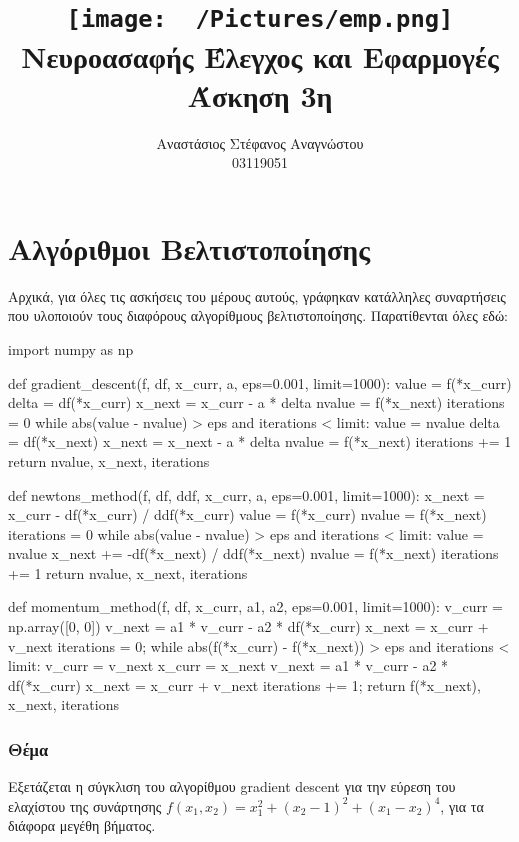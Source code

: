 \documentclass{article}
\title{
    \texttt{[image: ~/Pictures/emp.png]} \\
    \vskip 5cm
    Νευροασαφής Έλεγχος και Εφαρμογές\\
    \large Άσκηση 3η
    \vskip 5cm
}
\author{Αναστάσιος Στέφανος Αναγνώστου\\
        03119051}
\newcommand{\eng}[1]{\foreignlanguage{english}{#1}} %
\begin{document}
\maketitle
\newpage
\tableofcontents
\newpage

\part{Αλγόριθμοι Βελτιστοποίησης}

Αρχικά, για όλες τις ασκήσεις του μέρους αυτούς, γράφηκαν κατάλληλες
συναρτήσεις που υλοποιούν τους διαφόρους αλγορίθμους βελτιστοποίησης.
Παρατίθενται όλες εδώ:

\begin{python}
import numpy as np 

def gradient_descent(f, df, x_curr, a, eps=0.001, limit=1000):
    value = f(*x_curr)
    delta = df(*x_curr)
    x_next = x_curr - a * delta 
    nvalue = f(*x_next)
    iterations = 0
    while abs(value - nvalue) > eps and iterations < limit:
        value = nvalue
        delta = df(*x_next)
        x_next = x_next - a * delta 
        nvalue = f(*x_next)
        iterations += 1
    return nvalue, x_next, iterations

def newtons_method(f, df, ddf, x_curr, a, eps=0.001, limit=1000):
    x_next = x_curr - df(*x_curr) / ddf(*x_curr)
    value = f(*x_curr)
    nvalue = f(*x_next)
    iterations = 0
    while abs(value - nvalue) > eps and iterations < limit:
        value = nvalue
        x_next += -df(*x_next) / ddf(*x_next)
        nvalue = f(*x_next)
        iterations += 1
    return nvalue, x_next, iterations

def momentum_method(f, df, x_curr, a1, a2, eps=0.001, limit=1000):
    v_curr = np.array([0, 0])
    v_next = a1 * v_curr - a2 * df(*x_curr)
    x_next = x_curr + v_next
    iterations = 0;
    while abs(f(*x_curr) - f(*x_next)) > eps and iterations < limit:
        v_curr = v_next
        x_curr = x_next
        v_next = a1 * v_curr - a2 * df(*x_curr)
        x_next = x_curr + v_next
        iterations += 1;
    return f(*x_next), x_next, iterations
\end{python}

\clearpage
\section{Θέμα}

Εξετάζεται η σύγκλιση του αλγορίθμου \eng{gradient descent} για την εύρεση του
ελαχίστου της συνάρτησης $f(x_1,x_2) = x_1^2 +(x_2 - 1)^2 + (x_1 - x_2)^4$, για
τα διάφορα μεγέθη βήματος.
\end{document}
